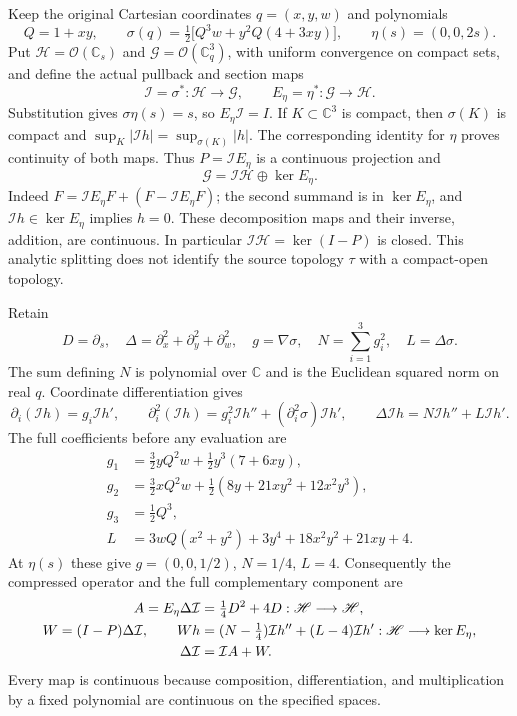 Keep the original Cartesian coordinates $q=(x,y,w)$ and polynomials
\[
 Q=1+xy,\qquad
 \sigma(q)=\tfrac12\bigl[Q^3w+y^2Q(4+3xy)\bigr],\qquad
 \eta(s)=(0,0,2s).
\]
Put $\mathscr H=\mathcal O(\mathbb C_s)$ and
$\mathscr G=\mathcal O(\mathbb C_q^3)$, with uniform convergence on compact
sets, and define the actual pullback and section maps
\[
 \mathcal I =\sigma^*:\mathscr H\longrightarrow\mathscr G,\qquad
 E_\eta=\eta^*:\mathscr G\longrightarrow\mathscr H.
\]
Substitution gives $\sigma\eta(s)=s$, so $E_\eta \mathcal I =I$.
If $K\subset\mathbb C^3$ is compact, then $\sigma(K)$ is compact and
$\sup_K|\mathcal I h|=\sup_{\sigma(K)}|h|$. The corresponding identity for $\eta$
proves continuity of both maps. Thus $P=\mathcal I E_\eta$ is a continuous
projection and
\begin{equation}
 \mathscr G=\mathcal I \mathscr H\oplus\ker E_\eta .
 \label{eq:cq-spatial-splitting}
\end{equation}
Indeed $F=\mathcal I E_\eta F+(F-\mathcal I E_\eta F)$; the second summand is in
$\ker E_\eta$, and $\mathcal I h\in\ker E_\eta$ implies $h=0$.
These decomposition maps and their inverse, addition, are continuous.
In particular $\mathcal I \mathscr H=\ker(I-P)$ is closed. This analytic splitting
does not identify the source topology $\tau$ with a compact-open topology.

Retain
\[
 D=\partial_s,\quad
 \Delta=\partial_x^2+\partial_y^2+\partial_w^2,\quad
 g=\nabla\sigma,\quad N=\sum_{i=1}^3g_i^2,\quad L=\Delta\sigma.
\]
The sum defining $N$ is polynomial over $\mathbb C$ and is the Euclidean
squared norm on real $q$. Coordinate differentiation gives
\[
 \partial_i(\mathcal I h)=g_i\mathcal I h',\qquad
 \partial_i^2(\mathcal I h)=g_i^2\mathcal I h''+(\partial_i^2\sigma)\mathcal I h',
 \qquad \Delta \mathcal I h=N\mathcal I h''+L\mathcal I h'.
\]
The full coefficients before any evaluation are
\begin{align*}
 g_1&=\tfrac32yQ^2w+\tfrac12y^3(7+6xy),\\
 g_2&=\tfrac32xQ^2w+\tfrac12(8y+21xy^2+12x^2y^3),\\
 g_3&=\tfrac12Q^3,\\
 L&=3wQ(x^2+y^2)+3y^4+18x^2y^2+21xy+4 .
\end{align*}
At $\eta(s)$ these give $g=(0,0,1/2)$, $N=1/4$, $L=4$.
Consequently the compressed operator and the full complementary
component are
\begin{align}
 A=E_\eta\Delta \mathcal I &=\tfrac14D^2+4D:
                  \mathscr H\longrightarrow\mathscr H,
                  \label{eq:cq-spatial-compression}\\
 W=(I-P)\Delta \mathcal I ,\qquad
 Wh&=(N-\tfrac14)\mathcal I h''+(L-4)\mathcal I h':
                  \mathscr H\longrightarrow\ker E_\eta ,
                  \label{eq:cq-spatial-leakage}\\
 \Delta \mathcal I &=\mathcal I A+W. \notag
\end{align}
Every map is continuous because composition, differentiation, and
multiplication by a fixed polynomial are continuous on the specified
spaces.

